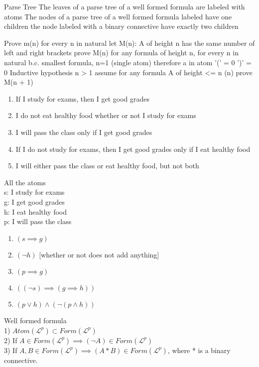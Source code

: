 \documentclass[12pt,oneside,notitlepage]{book}
\theoremstyle{definition}
\newcommand{\Lp}{\mathcal{L}^p}
\begin{document}
Parse Tree
The leaves of a parse tree of a well formed formula are labeled with atoms
The nodes of a parse tree of a well formed formula labeled have one children
the node labeled with a binary connective have exactly two children

Prove m(n) for every n in natural
let M(n): A of height n has the same number of left and right brackets
prove M(n) for any formula of height n, for every n in natural
b.c. smallest formula, n=1 (single atom)
therefore a in atom
'(' = 0
')' = 0
Inductive hypothesis
n > 1
assume for any formula A of height <= n (n) prove M(n + 1)

\begin{enumerate}
\item If I study for exams, then I get good grades \\
\item I do not eat healthy food whether or not I study for exams
\item I will pass the class only if I get good grades
\item If I do not study for exams, then I get good grades only if I eat healthy food
\item I will either pass the class or eat healthy food, but not both
\end{enumerate}
All the atoms \\
s: I study for exams \\
g: I get good grades \\
h: I eat healthy food \\
p: I will pass the class
\begin{enumerate}
\item $(s \implies g)$
\item $(\neg h)$ [whether or not does not add anything]
\item $(p \implies g)$
\item $((\neg s) \implies (g \implies h))$
\item $(p \lor h) \land (\neg (p \land h))$
\end{enumerate}

Well formed formula \\
1) $Atom(\Lp) \subset Form(\Lp)$ \\
2) If $A \in Form(\Lp) \implies (\neg A) \in Form(\Lp)$ \\
3) If $A,B \in Form(\Lp) \implies (A * B) \in Form(\Lp)$, where * is a binary connective.
\end{document}
